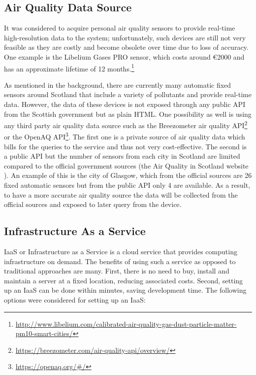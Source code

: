 \subsection{Air Quality Data Source}
It was considered to acquire personal air quality sensors to provide real-time high-resolution data to the system; unfortunately, such devices are still not very feasible as they are costly and become obsolete over time due to loss of accuracy. One example is the Libelium Gases PRO sensor, which costs around \euro{}2000 and has an approximate lifetime of 12 months.\footnote{\url{http://www.libelium.com/calibrated-air-quality-gas-dust-particle-matter-pm10-smart-cities/}} 

As mentioned in the background, there are currently many automatic fixed sensors around Scotland that include a variety of pollutants and provide real-time data. However, the data of these devices is not exposed through any public API from the Scottish government but as plain HTML. One possibility as well is using any third party air quality data source such as the Breezometer air quality API\footnote{\url{https://breezometer.com/air-quality-api/overview/}} or the OpenAQ API\footnote{\url{https://openaq.org/#/}}. The first one is a private source of air quality data which bills for the queries to the service and thus not very cost-effective. The second is a public API but the number of sensors from each city in Scotland are limited compared to the official government sources (the Air Quality in Scotland website \cite{Scottishairquality.co.uk2016}). An example of this is the city of Glasgow, which from the official sources are 26 fixed automatic sensors but from the public API only 4 are available. As a result, to have a more accurate air quality source the data will be collected from the official sources and exposed to later query from the device. 


\subsection{Infrastructure As a Service}

IaaS or Infrastructure as a Service is a cloud service that provides computing infrastructure on demand. The benefits of using such a service as opposed to traditional approaches are many. First, there is no need to buy, install and maintain a server at a fixed location, reducing associated costs. Second, setting up an IaaS can be done within minutes, saving  development time. The following options were considered for setting up an IaaS: 

